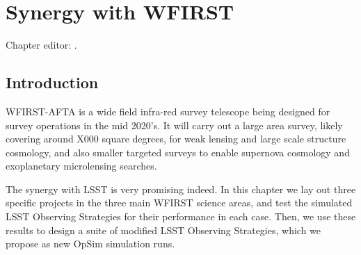 \chapter[Synergy with WFIRST]{Synergy with WFIRST}
\def\chpname{wfirst}\label{chp:\chpname}

Chapter editor:
.



\section{Introduction}
\label{sec:wfirst:intro}


WFIRST-AFTA is a wide field infra-red survey telescope being designed for
survey operations in the mid 2020's. It will carry out a large area survey,
likely covering around X000 square degrees, for weak lensing and large scale
structure cosmology, and also smaller targeted surveys to enable supernova
cosmology and exoplanetary microlensing searches.

The synergy with LSST is very promising indeed. In this chapter we lay out
three specific projects in the three main WFIRST science areas, and test the
simulated LSST Observing Strategies for their performance in each case. Then,
we use these results to design a suite of modified LSST Observing Strategies,
which we propose as new OpSim simulation runs.












\navigationbar
